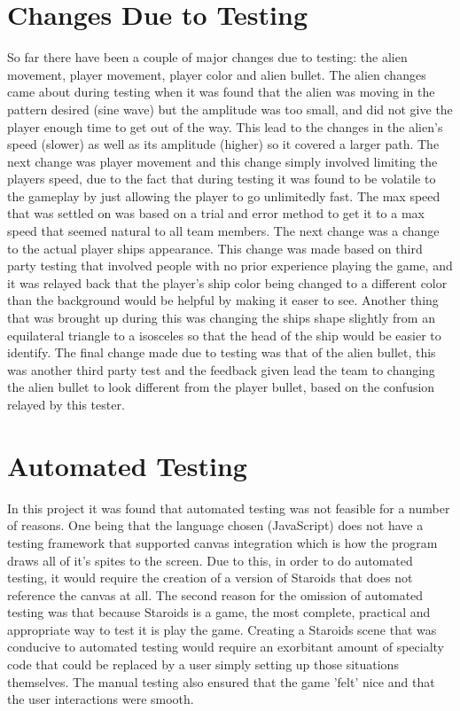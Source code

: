 \documentclass[12pt, titlepage]{article}
\begin{document}
\section{Changes Due to Testing}
So far there have been a couple of major changes due to testing: the alien movement, player movement, player color and alien bullet. The alien changes came about during testing when it was found that the alien was moving in the pattern desired (sine wave) but the amplitude was too small, and did not give the player enough time to get out of the way. This lead  to the changes in the alien's speed (slower) as well as its amplitude (higher) so it covered a larger path. The next change was player movement and this change simply involved limiting the players speed, due to the fact that during testing it was found to be volatile to the gameplay by just allowing the player to go unlimitedly fast. The max speed that was settled on was based on a trial and error method to get it to a max speed that seemed natural to all team members. The next change was a change to the actual player ships appearance. This change was made based on third party testing that involved people with no prior experience playing the game, and it was relayed back that the player's ship color being changed to a different color than the background would be helpful by making it easer to see. Another thing that was brought up during this was changing the ships shape slightly from an equilateral triangle to a isosceles so that the head of the ship would be easier to identify. The final change made due to testing was that of the alien bullet, this was another third party test and the feedback given lead the team to changing the alien bullet to look  different from the player bullet, based on the confusion relayed by this tester.

\section{Automated Testing}
In this project it was found that automated testing was not feasible for a number of reasons. One being that the language chosen (JavaScript) does not have a testing framework that supported canvas integration which is how the program draws all of it's spites to the screen. Due to this, in order to do automated testing, it would require the creation of a version of Staroids that does not reference the canvas at all. The second reason for the omission of automated testing was that because Staroids is a game, the most complete, practical and appropriate way to test it is play the game. Creating a Staroids scene that was conducive to automated testing would require an exorbitant amount of specialty code that could be replaced by a user simply setting up those situations themselves. The manual testing also ensured that the game 'felt' nice and that the user interactions were smooth.
\end{document}
